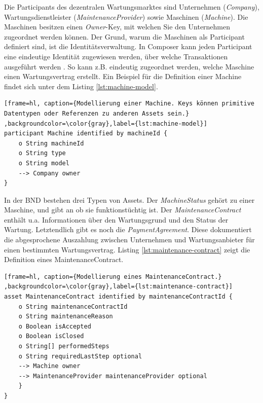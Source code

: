 Die Participants des dezentralen Wartungsmarktes sind Unternehmen (\textit{Company}), Wartungsdienstleister (\textit{MaintenanceProvider}) sowie Maschinen (\textit{Machine}). Die Maschinen besitzen einen \textit{Owner}-Key, mit welchen Sie den Unternehmen zugeordnet werden können. Der Grund, warum die Maschinen als Participant definiert sind, ist die Identitätsverwaltung. In Composer kann jeden Participant eine eindeutige Identität zugewiesen werden, über welche Transaktionen ausgeführt werden \cite{HyperledgerComposerTeamParticipantsidentitiesHyperledger}. So kann z.B. eindeutig zugeordnet werden, welche Maschine einen Wartungsvertrag erstellt. Ein Beispiel für die Definition einer Machine findet sich unter dem Listing \ref{lst:machine-model}.

\begin{lstfloat}
\begin{lstlisting}[frame=hl, caption={Modellierung einer Machine. Keys können primitive Datentypen oder Referenzen zu anderen Assets sein.} ,backgroundcolor=\color{gray},label={lst:machine-model}]
participant Machine identified by machineId {
    o String machineId
    o String type
    o String model
    --> Company owner
}
\end{lstlisting} 
\end{lstfloat}

In der \acs{BND} bestehen drei Typen von Assets. Der \textit{MachineStatus} gehört zu einer Maschine, und gibt an ob sie funktionstüchtig ist. Der \textit{MaintenanceContract} enthält u.a. Informationen über den Wartungsgrund und den Status der Wartung. Letztendlich gibt es noch die \textit{PaymentAgreement}. Diese dokumentiert die abgesprochene Auszahlung zwischen Unternehmen und Wartungsanbieter für einen bestimmten Wartungsvertrag. Listing \ref{lst:maintenance-contract} zeigt die Definition eines MaintenanceContract.

\begin{lstfloat}
\begin{lstlisting}[frame=hl, caption={Modellierung eines MaintenanceContract.} ,backgroundcolor=\color{gray},label={lst:maintenance-contract}]
asset MaintenanceContract identified by maintenanceContractId {
    o String maintenanceContractId
    o String maintenanceReason
    o Boolean isAccepted
    o Boolean isClosed
    o String[] performedSteps
    o String requiredLastStep optional
    --> Machine owner
    --> MaintenanceProvider maintenanceProvider optional
    }
}
\end{lstlisting} 
\end{lstfloat}

